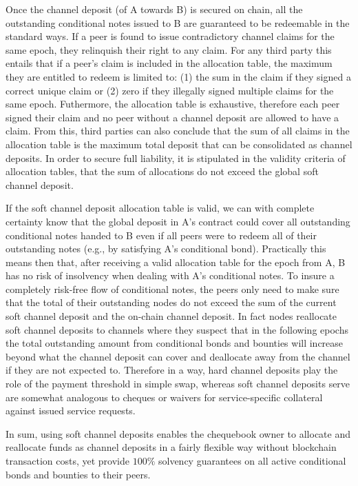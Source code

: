 Once the channel deposit (of A towards B) is secured on chain, all the outstanding conditional notes
issued to B are guaranteed to be redeemable in the standard ways.
If a peer is found to issue contradictory channel claims for the same epoch, they relinquish
their right to any claim. For any third party this entails that if a peer's claim is
included in the allocation table, the maximum they are entitled to redeem is limited to:
(1) the sum in the claim if they signed a correct unique claim or
(2) zero if they illegally signed multiple claims for the same epoch.
Futhermore, the allocation table is exhaustive, therefore each
peer signed their claim and no peer without a channel deposit are allowed to have a claim. 
From this, third parties can also conclude that the sum of all claims in the
allocation table is the maximum total deposit that can be consolidated as channel deposits.
In order to secure full liability, it is stipulated in the validity criteria of allocation tables, that the sum of allocations do not exceed the global soft channel deposit.

If the soft channel deposit allocation table is valid,
we can with complete certainty know that the global deposit in A's contract
 could cover all outstanding conditional notes handed to B even if all peers were to redeem all of their outstanding notes (e.g., by satisfying A's conditional bond).
Practically this means then that, after receiving a valid allocation table for the epoch from A,
B has no risk of insolvency when dealing with A's conditional notes.
To insure a completely risk-free flow of conditional notes, the peers only  need to make sure that the total of their outstanding nodes do not exceed the sum of the current soft channel  deposit and the on-chain channel  deposit. 
In fact nodes reallocate soft channel deposits to channels where they suspect that in the following epochs the total outstanding amount from conditional bonds and bounties will increase beyond what the channel deposit can cover and deallocate away from the channel if they are not expected to.
Therefore in a way, hard channel deposits play the role of the payment  threshold in simple swap, whereas soft channel deposits serve are somewhat analogous to cheques or waivers for service-specific collateral against issued service requests. 

In sum, using soft channel deposits enables the chequebook owner to allocate and reallocate funds
as channel deposits in a fairly flexible way without blockchain transaction costs,
yet provide $100\%$ solvency guarantees on all active conditional bonds and bounties to their peers.
